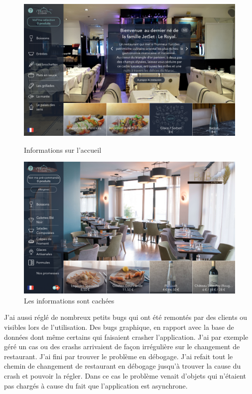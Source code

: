 \begin{figure}[!htb]
  \centering
  \begin{minipage}[b]{0.45\textwidth}
    \includegraphics[width=\textwidth]{images/divers2.png}
    \caption{Informations sur l'accueil}
  \end{minipage}
  \hfill
  \begin{minipage}[b]{0.45\textwidth}
    \includegraphics[width=\textwidth]{images/divers3.png}
    \caption{Les informations sont cachées}
  \end{minipage}
\end{figure}

\clearpage

J'ai aussi réglé de nombreux petits bugs qui ont été remontés par des clients ou visibles lors de l'utilisation. Des bugs graphique, en rapport avec la base de données dont même certains qui faisaient crasher l'application. J'ai par exemple géré un cas ou des crashs arrivaient de façon irrégulière sur le changement de restaurant. J'ai fini par trouver le problème en débogage. J'ai refait tout le chemin de changement de restaurant en débogage jusqu'à trouver la cause du crash et pouvoir la régler. Dans ce cas le problème venait d'objets qui n'étaient pas chargés à cause du fait que l'application est asynchrone.

